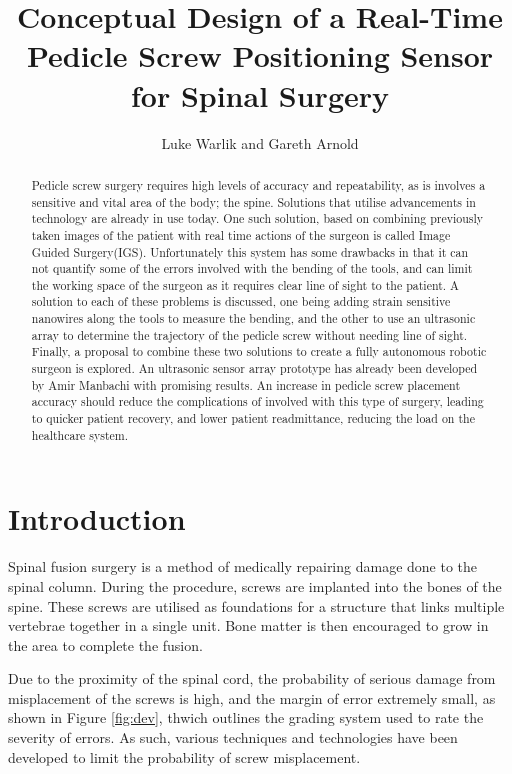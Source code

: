 \documentclass[conference, a4paper]{IEEEtran}
\begin{document}
%
\title{Conceptual Design of a Real-Time Pedicle Screw Positioning Sensor for
Spinal Surgery}
\author{Luke Warlik and Gareth Arnold}


\maketitle


\begin{abstract}
	Pedicle screw surgery requires high levels of accuracy and repeatability, 
	as is involves a sensitive and vital area of the body; the spine. Solutions
	that utilise advancements in technology are already in use today. One such
	solution, based on combining previously taken images of the patient with 
	real time actions of the surgeon is called Image Guided Surgery(IGS). Unfortunately
	this system has some drawbacks in that it can not quantify some of the errors involved
	with the bending of the tools, and can limit the working space of the surgeon as it
	requires clear line of sight to the patient. A solution to each of these problems 
	is discussed, one being adding strain sensitive nanowires along the tools to measure
	the bending, and the other to use an ultrasonic array to determine the trajectory 
	of the pedicle screw without needing line of sight. Finally, a proposal to combine
	these two solutions to create a fully autonomous robotic surgeon is explored.
	An ultrasonic sensor array prototype has already been developed by Amir Manbachi with 
	promising results. An increase in pedicle screw placement accuracy should reduce
	the complications of involved with this type of surgery, leading to quicker 
	patient recovery, and lower patient readmittance, reducing the load on the 
	healthcare system.
\end{abstract}


\section{Introduction}

Spinal fusion surgery is a method of medically repairing damage done to the spinal column. During the
procedure, screws are implanted into the bones of the spine. These screws are utilised as foundations for a
structure that links multiple vertebrae together in a single unit. Bone matter is then encouraged to grow in the
area to complete the fusion\cite{Manbachi2014}.

Due to the proximity of the spinal cord, the probability of serious damage from
misplacement of the screws is high, and the margin of error extremely small, as shown in Figure \ref{fig:dev}, 
thwich outlines the grading system used to rate the severity of errors.
As such, various techniques and technologies have been developed to limit the probability of screw misplacement\cite{neuro}.
\end{document}
